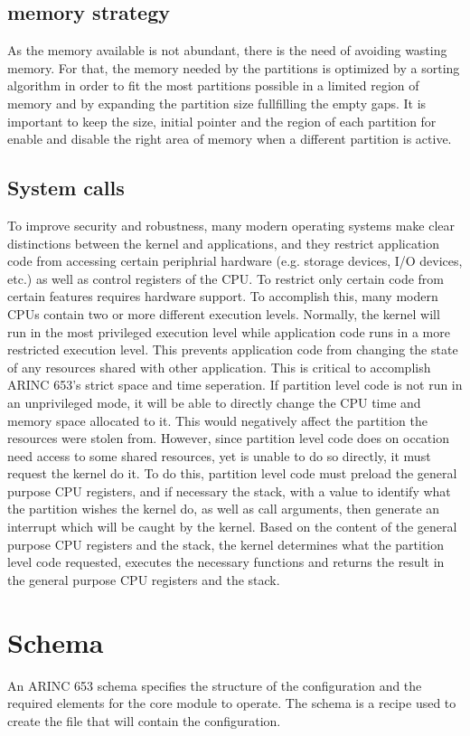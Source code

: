 \subsection{memory strategy}
As the memory available is not abundant, there is the need of avoiding wasting memory. For that, the memory needed by the partitions is optimized by a sorting algorithm in order to fit 
the most partitions possible in a limited region of memory and by expanding the partition size fullfilling 
the empty gaps. It is important to keep the size, initial pointer and the region of each partition for enable and disable the right area of memory when a different partition is active.

\subsection{System calls}
To improve security and robustness, many modern operating systems make clear 
distinctions between the kernel and applications, and they restrict application
code from accessing certain periphrial hardware (e.g. storage devices, I/O
devices, etc.) as well as control registers of the CPU. 
To restrict only certain code from certain features requires hardware support.
To accomplish this, many modern CPUs contain two or more different execution
levels. Normally, the kernel will run in the most privileged execution level
while application code runs in a more restricted execution level. This prevents
application code from changing the state of any resources shared with other
application. This is critical to accomplish ARINC 653's strict space and time 
seperation. If partition level code is not run in an unprivileged mode, it will
be able to directly change the CPU time and memory space allocated to it. This
would negatively affect the partition the resources were stolen from. However,
since partition level code does on occation need access to some shared resources,
yet is unable to do so directly, it must request the kernel do it. To do this,
partition level code must preload the general purpose CPU registers, and if
necessary the stack, with a value to identify what the partition wishes the
kernel do, as well as call arguments, then generate an interrupt which will be
caught by the kernel. Based on the content of the general purpose CPU registers
and the stack, the kernel determines what the partition level code requested,
executes the necessary functions and returns the result in the general purpose 
CPU registers and the stack.

\section{Schema}
\label{sec:design_schema}
An ARINC 653 schema specifies the structure 
of the configuration and the required elements 
for the core module to operate.
The schema is a recipe used to create the file 
that will contain the configuration.

